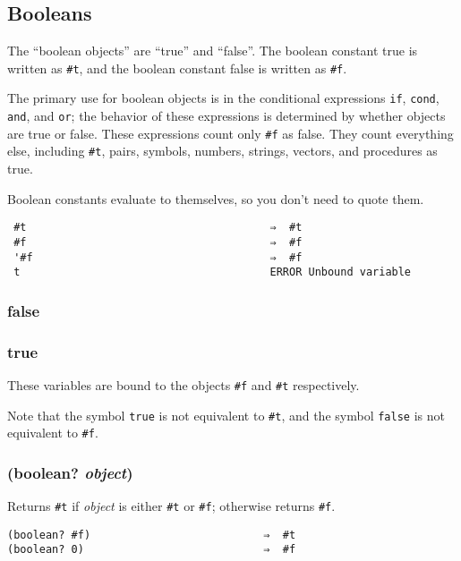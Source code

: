 \documentclass{article}
\begin{document}
\subsection{Booleans}\label{sec:booleans}

The ``boolean objects'' are ``true'' and ``false''. The boolean constant true is written as
\verb|#t|, and the boolean constant false is written as \verb|#f|.

The primary use for boolean objects is in the conditional expressions \verb|if|,
\verb|cond|, \verb|and|, and \verb|or|; the behavior of these expressions is determined
by whether objects are true or false. These expressions count only \verb|#f| as false. They
count everything else, including \verb|#t|, pairs, symbols, numbers, strings, vectors, and
procedures as true.

Boolean constants evaluate to themselves, so you don't need to quote them.

\begin{verbatim}
 #t                                      ⇒  #t
 #f                                      ⇒  #f
 '#f                                     ⇒  #f
 t                                       ERROR Unbound variable
\end{verbatim}

\subsubsection{false}

\subsubsection{true}

These variables are bound to the objects \verb|#f| and \verb|#t| respectively.

Note that the symbol \verb|true| is not equivalent to \verb|#t|, and the symbol
\verb|false| is not equivalent to \verb|#f|.

\subsubsection{(boolean? \emph{object})}

Returns \verb|#t| if \emph{object} is either \verb|#t| or \verb|#f|; otherwise
returns \verb|#f|.

\begin{verbatim}
(boolean? #f)                           ⇒  #t
(boolean? 0)                            ⇒  #f
\end{verbatim}
\end{document}
